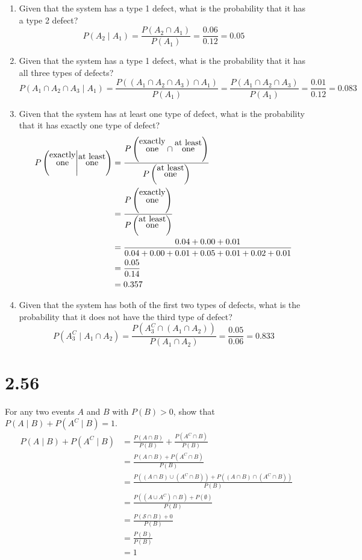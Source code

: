 \documentclass[letterpaper,12pt,fleqn]{article}
\begin{document}
\bigskip

\begin{enumerate}[label={\alph*)}]
\item Given that the system has a type 1 defect, what is the probability that it has a type 2 defect?
  \[P(A_2\mid A_1)=\frac{P(A_2\cap A_1)}{P(A_1)}=\frac{0.06}{0.12}=0.05\]

\item Given that the system has a type 1 defect, what is the probability that it has all three types of defects?
  \[P(A_1\cap A_2\cap A_3\mid A_1)=\frac{P((A_1\cap A_2\cap A_3)\cap A_1)}{P(A_1)}=
  \frac{P(A_1\cap A_2\cap A_3)}{P(A_1)}=\frac{0.01}{0.12}=0.083\]

  \newcommand{\eo}{\text{\shortstack{exactly \\ one}}}
  \newcommand{\ao}{\text{\shortstack{at least \\ one}}}

\item Given that the system has at least one type of defect, what is the probability that it has exactly one type of defect?
  \begin{align*}
    P\left(\eo\middle\vert\ao\right) &= \frac{P\left(\eo\cap\ao\right)}{P\left(\ao\right)} \\
    &= \frac{P\left(\eo\right)}{P\left(\ao\right)} \\
    &= \frac{0.04+0.00+0.01}{0.04+0.00+0.01+0.05+0.01+0.02+0.01} \\
    &= \frac{0.05}{0.14} \\
    &= 0.357
  \end{align*}

\item Given that the system has both of the first two types of defects, what is the probability that it does not have the
  third type of defect?
  \[P(A_3^C\mid A_1\cap A_2)=\frac{P(A_3^C\cap(A_1\cap A_2))}{P(A_1\cap A_2)}=\frac{0.05}{0.06}=0.833\]
\end{enumerate}

\section*{2.56}

For any two events \(A\) and \(B\) with \(P(B)>0\), show that \(P(A\mid B)+P(A^C\mid B)=1\).
\begin{align*}
  P(A\mid B)+P(A^C\mid B) &= \frac{P(A\cap B)}{P(B)}+\frac{P(A^C\cap B)}{P(B)} \\
  &= \frac{P(A\cap B)+P(A^C\cap B)}{P(B)} \\
  &= \frac{P((A\cap B)\cup(A^C\cap B))+P((A\cap B)\cap(A^C\cap B))}{P(B)} \\
  &= \frac{P((A\cup A^C)\cap B)+P(\emptyset)}{P(B)} \\
  &= \frac{P(\mathcal{S}\cap B)+0}{P(B)} \\
  &= \frac{P(B)}{P(B)} \\
  &= 1
\end{align*}
\end{document}
